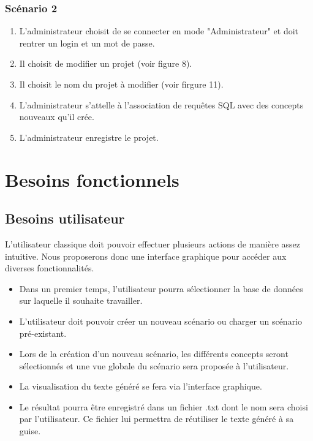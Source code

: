 \documentclass[12pt]{report}
\begin{document}
\subsubsection{Scénario 2}   
    \begin{enumerate}
    \item L'administrateur choisit de se connecter en mode "Administrateur" et doit rentrer un login et un mot de passe.
    		\item Il choisit de modifier un projet (voir figure 8).
            \item Il choisit le nom du projet à modifier (voir firgure 11).
            \item L'administrateur s'attelle à l'association de requêtes SQL avec des concepts nouveaux qu'il crée.
            \item L'administrateur enregistre le projet.
            \end{enumerate}


\section{Besoins fonctionnels}

\subsection{Besoins utilisateur}

L'utilisateur classique doit pouvoir effectuer plusieurs actions de manière assez intuitive. Nous proposerons donc une interface graphique pour accéder aux diverses fonctionnalités.

	\begin{itemize}
	\item Dans un premier temps, l'utilisateur pourra sélectionner la base de données sur laquelle il souhaite travailler.
	\item L'utilisateur doit pouvoir créer un nouveau scénario ou charger un scénario pré-existant.
	\item Lors de la création d'un nouveau scénario, les différents concepts seront sélectionnés et une vue globale du scénario sera proposée à l'utilisateur.
	\item La visualisation du texte généré se fera via l'interface graphique.
	\item Le résultat pourra être enregistré dans un fichier .txt dont le nom sera choisi par l'utilisateur. Ce fichier lui permettra de réutiliser le texte généré à sa guise.
	\end{itemize}
\end{document}

